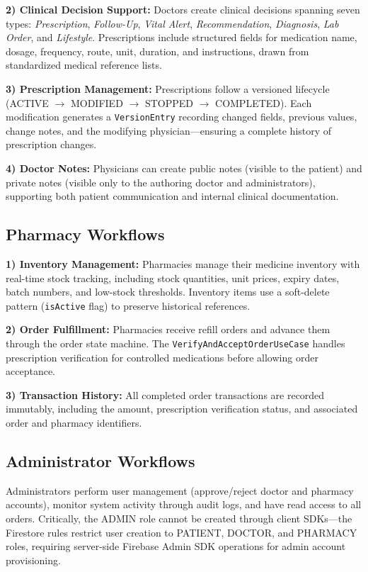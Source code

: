 \documentclass[journal,onecolumn,web]{ieeecolor}
\begin{document}
{\bf 2) Clinical Decision Support:} Doctors create
clinical decisions spanning seven types:
{\it Prescription}, {\it Follow-Up},
{\it Vital Alert}, {\it Recommendation},
{\it Diagnosis}, {\it Lab Order}, and
{\it Lifestyle}. Prescriptions include structured
fields for medication name, dosage, frequency, route,
unit, duration, and instructions, drawn from
standardized medical reference lists.

{\bf 3) Prescription Management:} Prescriptions follow
a versioned lifecycle (ACTIVE $\rightarrow$ MODIFIED
$\rightarrow$ STOPPED $\rightarrow$ COMPLETED). Each
modification generates a {\tt VersionEntry} recording
changed fields, previous values, change notes, and
the modifying physician---ensuring a complete history
of prescription changes.

{\bf 4) Doctor Notes:} Physicians can create public
notes (visible to the patient) and private notes
(visible only to the authoring doctor and
administrators), supporting both patient communication
and internal clinical documentation.

\subsection{Pharmacy Workflows}
{\bf 1) Inventory Management:} Pharmacies manage their
medicine inventory with real-time stock tracking,
including stock quantities, unit prices, expiry dates,
batch numbers, and low-stock thresholds. Inventory
items use a soft-delete pattern ({\tt isActive} flag)
to preserve historical references.

{\bf 2) Order Fulfillment:} Pharmacies receive refill
orders and advance them through the order state
machine. The {\tt VerifyAndAcceptOrderUseCase} handles
prescription verification for controlled medications
before allowing order acceptance.

{\bf 3) Transaction History:} All completed order
transactions are recorded immutably, including the
amount, prescription verification status, and
associated order and pharmacy identifiers.

\subsection{Administrator Workflows}
Administrators perform user management (approve/reject
doctor and pharmacy accounts), monitor system activity
through audit logs, and have read access to all orders.
Critically, the ADMIN role cannot be created through
client SDKs---the Firestore rules restrict user
creation to PATIENT, DOCTOR, and PHARMACY roles,
requiring server-side Firebase Admin SDK operations
for admin account provisioning.
\end{document}
